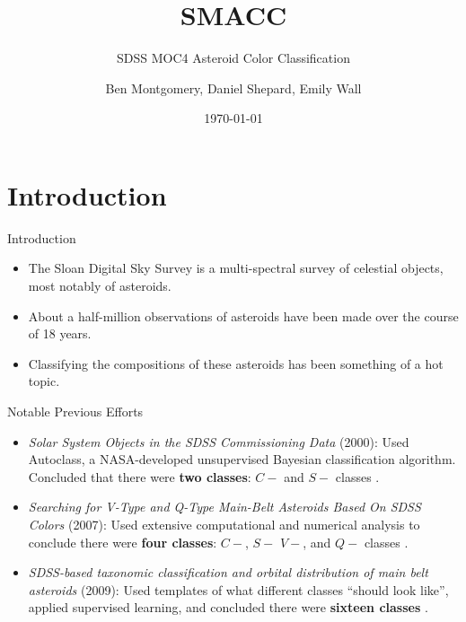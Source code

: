 \documentclass[10pt,xcolor={table,dvipsnames},t]{beamer}
\title[SMACC]{SMACC}
\subtitle{SDSS MOC4 Asteroid Color Classification}
\author{Ben Montgomery, Daniel Shepard, Emily Wall}
\institute{University of Southern Maine}
\date{\today}
\begin{document}
\begin{frame}
  \titlepage
\end{frame}

\section{Introduction}

\begin{frame}{Introduction}
\begin{itemize}
    \item The Sloan Digital Sky Survey is a multi-spectral survey of celestial objects, most notably of asteroids.
    \item About a half-million observations of asteroids have been made over the course of 18 years.
    \item Classifying the compositions of these asteroids has been something of a hot topic.
\end{itemize}
\end{frame}

\begin{frame}{Notable Previous Efforts}
\begin{itemize}
    \item \textit{Solar System Objects in the {SDSS} Commissioning Data} (2000): Used Autoclass, a NASA-developed unsupervised Bayesian classification algorithm. Concluded that there were \textbf{two classes}: $C-$ and $S-$ classes \cite{Autoclass}.
    \item \textit{Searching for V-Type and Q-Type Main-Belt Asteroids Based On SDSS Colors} (2007): Used extensive computational and numerical analysis to conclude there were \textbf{four classes}: $C-$, $S-$ $V-$, and $Q-$ classes \cite{binzal_colors}.
    \item \textit{SDSS-based taxonomic classification and orbital distribution of main belt asteroids} (2009): Used templates of what different classes ``should look like'', applied supervised learning, and concluded there were \textbf{sixteen classes} \cite{Carvano}.
\end{itemize}
\end{frame}
\end{document}
